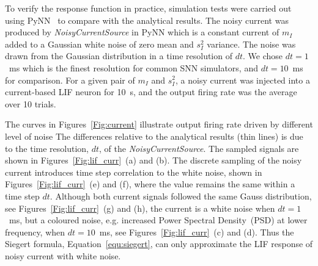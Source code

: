 	To verify the response function in practice, simulation tests were carried out using PyNN~\cite{davison2008pynn} to compare with the analytical results.
	The noisy current was produced by \textit{NoisyCurrentSource} in PyNN which is a constant current of $m_I$ added to a Gaussian white noise of zero mean and $s_I^2$ variance.
	The noise was drawn from the Gaussian distribution in a time resolution of $dt$.
	We chose $dt=1$~ms which is the finest resolution for common SNN simulators, and $dt=10$~ms for comparison.
	For a given pair of $m_I$ and $s_I^2$, a noisy current was injected into a current-based LIF neuron for 10~s, and the output firing rate was the average over 10 trials.
	
	The curves in Figures~\ref{Fig:current} illustrate output firing rate driven by different level of noise
	The differences relative to the analytical results (thin lines) is due to the time resolution, $dt$, of the \textit{NoisyCurrentSource}.
	The sampled signals are shown in Figures~\ref{Fig:lif_curr}~(a) and (b).
	The discrete sampling of the noisy current introduces time step correlation to the white noise, shown in Figures~\ref{Fig:lif_curr}~(e) and (f), where the value remains the same within a time step $dt$.
	Although both current signals followed the same Gauss distribution, see Figures~\ref{Fig:lif_curr}~(g) and (h), the current is a white noise when $dt=1$~ms, but a coloured noise, e.g. increased Power Spectral Density~(PSD) at lower frequency, when $dt=10$~ms, see Figures~\ref{Fig:lif_curr}~(c) and (d).
	Thus the Siegert formula, Equation~\ref{equ:siegert}, can only approximate the LIF response of noisy current with white noise.


